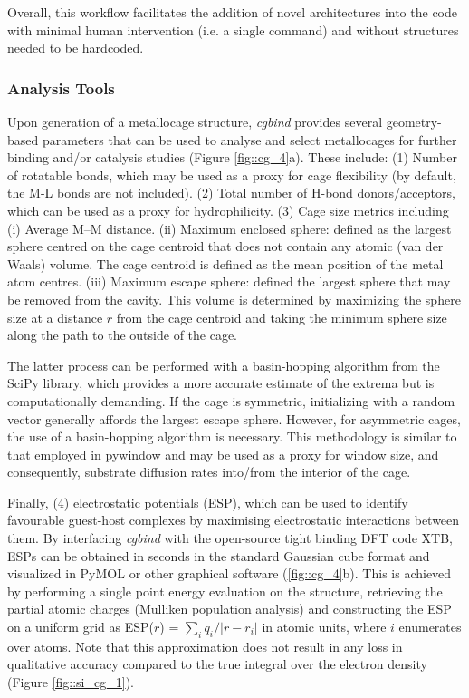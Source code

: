 \documentclass[../../main.tex]{subfiles}
\newcommand{\cgbind}{\emph{cgbind }}
\begin{document}
Overall, this workflow facilitates the addition of novel architectures into the code with minimal human intervention (i.e. a single command) and without structures needed to be hardcoded.


\subsubsection{Analysis Tools} 

Upon generation of a metallocage structure, \cgbind provides several geometry-based parameters that can be used to analyse and select metallocages for further binding and/or catalysis studies (Figure \ref{fig::cg_4}a). These include: (1) Number of rotatable bonds, which may be used as a proxy for cage flexibility (by default, the M-L bonds are not included).
(2) Total number of H-bond donors/acceptors, which can be used as a proxy for hydrophilicity. (3) Cage size metrics including  (i)	Average M–M distance.
(ii)	Maximum enclosed sphere: defined as the largest sphere centred on the cage centroid that does not contain any atomic (van der Waals) volume. The cage centroid is defined as the mean position of the metal atom centres.
(iii)	Maximum escape sphere: defined the largest sphere that may be removed from the cavity. This volume is determined by maximizing the sphere size at a distance $r$ from the cage centroid and taking the minimum sphere size along the path to the outside of the cage. 

The latter process can be performed with a basin-hopping algorithm from the SciPy library, which provides a more accurate estimate of the extrema but is computationally demanding.\cite{Wales1997} If the cage is symmetric, initializing with a random vector generally affords the largest escape sphere. However, for asymmetric cages, the use of a basin-hopping algorithm is necessary. This methodology is similar to that employed in pywindow\cite{Miklitz2018} and may be used as a proxy for window size, and consequently, substrate diffusion rates into/from the interior of the cage. 

Finally, (4) electrostatic potentials (ESP), which can be used to identify favourable guest-host complexes by maximising electrostatic interactions between them. By interfacing \cgbind with the open-source tight binding DFT code XTB,\cite{Bannwarth2019} ESPs can be obtained in seconds in the standard Gaussian cube format and visualized in PyMOL or other graphical software (\ref{fig::cg_4}b). This is achieved by performing a single point energy evaluation on the structure, retrieving the partial atomic charges (Mulliken population analysis) and constructing the ESP on a uniform grid as ESP($r$) = $\sum_i q_i/|r - r_i|$ in atomic units, where $i$ enumerates over atoms. Note that this approximation does not result in any loss in qualitative accuracy compared to the true integral over the electron density (Figure \ref{fig::si_cg_1}). 
\end{document}
